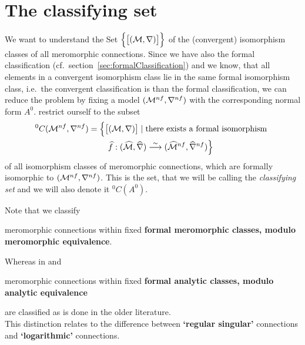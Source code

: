 \section{The classifying set}
We want to understand the Set
$\Big\{\big[(\mathcal{M},\nabla)\big]\Big\}$ of the (convergent)
isomorphism classes of all meromorphic connections. Since we have also the
formal classification (cf.\ section~\ref{sec:formalClassification}) and we
know, that all elements in a convergent isomorphism class lie in the same
formal isomorphism class, i.e.\ the convergent classification is
 than the formal classification, we can reduce the problem by
fixing a model $(\mathcal{M}^{nf},\nabla^{nf})$ with the corresponding normal form
$A^0$.
 restrict ourself to the subset
\begin{multline*}
  {}^0C(\mathcal{M}^{nf},\nabla^{nf})=\Big\{
    \big[(\mathcal{M},\nabla)\big]
    \mid \text{there exists a formal isomorphism }
  \\\qquad\widehat f:(\widehat{\mathcal{M}},\widehat\nabla)
      \overset{\sim}\longrightarrow
      (\widehat{\mathcal{M}}^{nf},\widehat\nabla^{nf})
  \Big\}
\end{multline*}
of all isomorphism classes of meromorphic connections, which are formally
isomorphic to $(\mathcal{M}^{nf},\nabla^{nf})$. This is the set, that we will be
calling the \emph{classifying set} and we will also denote it ${}^0C(A^0)$.
\begin{rem}
  Note that we classify
  \begin{einr}
    meromorphic connections within fixed \textbf{formal meromorphic classes,
    modulo meromorphic equivalence}.
  \end{einr}
  Whereas in \cite{boalch} and \cite{thboalch}
  \begin{einr}
    meromorphic connections within fixed \textbf{formal analytic classes,
    modulo analytic equivalence}
  \end{einr}
  are classified as is done in the older literature. 
  \\This distinction relates to the difference between \textbf{‘regular
  singular’} connections and \textbf{‘logarithmic’} connections.
\end{rem}
